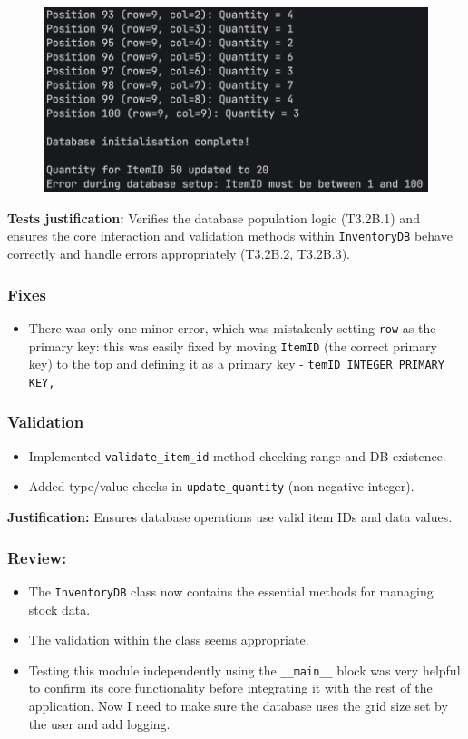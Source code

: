 \begin{figure}[htbp!]
	\centering
	\includegraphics[width=0.5\linewidth]{Images/cerf/3.2B.png}
\end{figure}

\textbf{Tests justification:} Verifies the database population logic (T3.2B.1) and ensures the core interaction and validation methods within \verb|InventoryDB| behave correctly and handle errors appropriately (T3.2B.2, T3.2B.3).

\subsubsection{Fixes}
\begin{itemize}
	\item There was only one minor error, which was mistakenly setting \verb|row| as the primary key: this was easily fixed by moving \verb|ItemID| (the correct primary key) to the top and defining it as a primary key - \verb*|temID INTEGER PRIMARY KEY,|
\end{itemize}

\subsubsection{Validation}
\begin{itemize}
	\item Implemented \verb|validate_item_id| method checking range and DB existence.
	\item Added type/value checks in \verb|update_quantity| (non-negative integer).
\end{itemize}
\textbf{Justification:} Ensures database operations use valid item IDs and data values.

\subsubsection{Review:}
\begin{itemize}
	\item The \verb|InventoryDB| class now contains the essential methods for managing stock data.
	\item The validation within the class seems appropriate.
	\item Testing this module independently using the \verb|__main__| block was very helpful to confirm its core functionality before integrating it with the rest of the application. Now I need to make sure the database uses the grid size set by the user and add logging.
\end{itemize}

